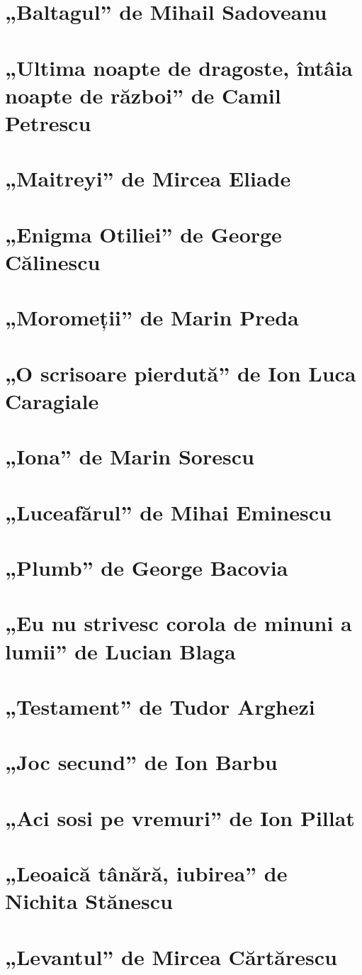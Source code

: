 \documentclass[a4paper]{book}
\begin{document}
\section{„Baltagul” de Mihail Sadoveanu}
\section{„Ultima noapte de dragoste, întâia noapte de război” de Camil Petrescu}
\section{„Maitreyi” de Mircea Eliade}
\section{„Enigma Otiliei” de George Călinescu}
\section{„Moromeții” de Marin Preda}
\section{„O scrisoare pierdută” de Ion Luca Caragiale}
\section{„Iona” de Marin Sorescu}
\section{„Luceafărul” de Mihai Eminescu}
\section{„Plumb” de George Bacovia}
\section{„Eu nu strivesc corola de minuni a lumii” de Lucian Blaga}
\section{„Testament” de Tudor Arghezi}
\section{„Joc secund” de Ion Barbu}
\section{„Aci sosi pe vremuri” de Ion Pillat}
\section{„Leoaică tânără, iubirea” de Nichita Stănescu}
\section{„Levantul” de Mircea Cărtărescu}
\end{document}
